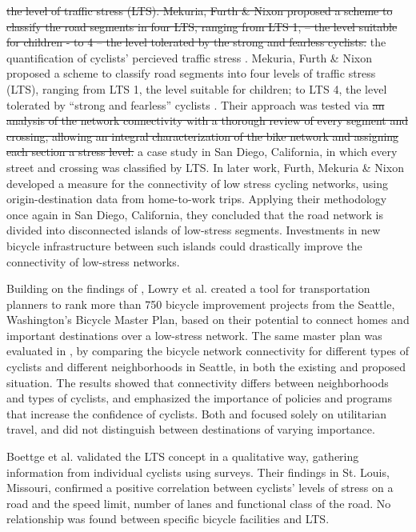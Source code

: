 \documentclass[information,article,submit,moreauthors,Latex,dvi2pdf,10pt,a4paper]{Definitions/mdpi}
\begin{document}
\begin{mycolorbox}[colback=yellow]
\sout{the level of traffic stress (LTS). Mekuria, Furth \& Nixon proposed a scheme to classify the road segments in four LTS, ranging from LTS 1, – the level suitable for children - to 4 – the level tolerated by the strong and fearless cyclists.}
the quantification of cyclists' percieved traffic stress \cite{Sorton1994,Geller2006}. Mekuria, Furth \& Nixon \cite{Mekuria2012b} proposed a scheme to classify road segments into four levels of traffic stress (LTS), ranging from LTS 1, the level suitable for children; to LTS 4, the level tolerated by “strong and fearless” cyclists \cite{Dill2016}. Their approach was tested via \sout{an analysis of the network connectivity with a thorough review of every segment and crossing, allowing an integral characterization of the bike network and assigning each section a stress level.} a case study in San Diego, California, in which every street and crossing was classified by LTS. In later work, Furth, Mekuria \& Nixon \cite{Furth2016} developed a measure for the connectivity of low stress cycling networks, using origin-destination data from home-to-work trips. Applying their methodology once again in San Diego, California, they concluded that the road network is divided into disconnected islands of low-stress segments. Investments in new bicycle infrastructure between such islands could drastically improve the connectivity of low-stress networks.

Building on the findings of \cite{Mekuria2012b}, Lowry et al. \cite{Lowry2016} created a tool for transportation planners to rank more than 750 bicycle improvement projects from the Seattle, Washington’s Bicycle Master Plan, based on their potential to connect homes and important destinations over a low-stress network. The same master plan was evaluated in \cite{Lowry2017}, by comparing the bicycle network connectivity for different types of cyclists and different neighborhoods in Seattle, in both the existing and proposed situation. The results showed that connectivity differs between neighborhoods and types of cyclists, and emphasized the importance of policies and programs that increase the confidence of cyclists. Both \cite{Lowry2016} and \cite{Lowry2017} focused solely on utilitarian travel, and did not distinguish between destinations of varying importance.

Boettge et al. \cite{Boettge2017} validated the LTS concept in a qualitative way, gathering information from individual cyclists using surveys. Their findings in St. Louis, Missouri, confirmed a positive correlation between cyclists' levels of stress on a road and the speed limit, number of lanes and functional class of the road. No relationship was found between specific bicycle facilities and LTS.
\end{mycolorbox}
\end{document}
